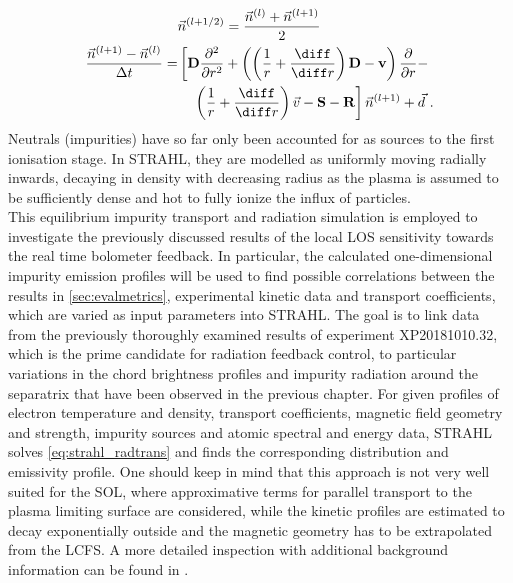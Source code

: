 %
            \begin{align}%
                \begin{split}%
                    &\vec{n}^{\left(l+1/2\right)}=\frac{\vec{n}^{\left(l\right)}+\vec{n}^{\left(l+1\right)}}{2}\,\,\\%
                    \frac{\vec{n}^{\left(l+1\right)}-\vec{n}^{\left(l\right)}}{\Delta t}=&\left[\mathbf{D}\frac{\partial^{2}}{\partial r^{2}}+\left(\left(\frac{1}{r}+\frac{\diff}{\diff r}\right)\mathbf{D}-\mathbf{v}\right)\frac{\partial}{\partial r}-\right.\\%
                    &\quad\left.\left(\frac{1}{r}+\frac{\diff}{\diff r}\right)\vec{v}-\mathbf{S}-\mathbf{R}\right]\vec{n}^{\left(l+1\right)}+\vec{d}\,\,.%
                \end{split}%
            \end{align}%
%
            Neutrals (impurities) have so far only been accounted for as sources to the first ionisation stage. In STRAHL, they are modelled as uniformly moving radially inwards, decaying in density with decreasing radius as the plasma is assumed to be sufficiently dense and hot to fully ionize the influx of particles.\\%
            This equilibrium impurity transport and radiation simulation is employed to investigate the previously discussed results of the local LOS sensitivity towards the real time bolometer feedback. In particular, the calculated one-dimensional impurity emission profiles will be used to find possible correlations between the results in \cref{sec:evalmetrics}, experimental kinetic data and transport coefficients, which are varied as input parameters into STRAHL. The goal is to link data from the previously thoroughly examined results of experiment XP20181010.32, which is the prime candidate for radiation feedback control, to particular variations in the chord brightness profiles and impurity radiation around the separatrix that have been observed in the previous chapter. For given profiles of electron temperature and density, transport coefficients, magnetic field geometry and strength, impurity sources and atomic spectral and energy data, STRAHL solves \cref{eq:strahl_radtrans} and finds the corresponding distribution and emissivity profile. One should keep in mind that this approach is not very well suited for the SOL, where approximative terms for parallel transport to the plasma limiting surface are considered, while the kinetic profiles are estimated to decay exponentially outside and the magnetic geometry has to be extrapolated from the LCFS. A more detailed inspection with additional background information can be found in \cite{Dux2006,Goncharov2007,Behringer1987}.\\%

